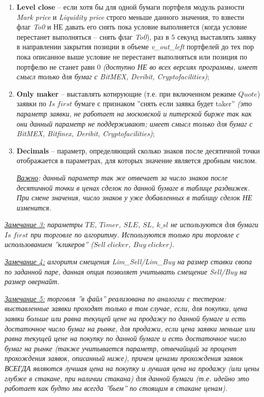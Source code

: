 \begin{enumerate}
	\item \textbf{Level close} -- если хотя бы для одной бумаги портфеля модуль разности \textit{Mark price} и \textit{Liquidity price} строго меньше данного
		значения, то взвести флаг \textit{To0} и НЕ давать его снять пока условие выполняется (когда условие перестанет выполняться -- снять флаг \textit{To0}), раз в $5$ секунд выставлять заявку в направлении закрытия позиции
		в объеме \textit{v\_out\_left} портфелей до тех пор пока описанное выше условие не перестанет выполняться или позиция по портфелю не станет равн $0$ \textit{(доступно НЕ во всех версиях программы, имеет смысл только для бумаг с BitMEX, Deribit, Cryptofacilities)};
	\item \textbf{Only maker} -- выставлять котирующие (т.е. при включенном режиме $Quote$) заявки по $Is \; first$ бумаге с признаком ''снять если заявка будет taker'' \textit{(это параметр заявки, не работает на московской и питерской бирже так как они данный параметр не поддерживают; имеет смысл только для бумаг с BitMEX, Bitfinex, Deribit, Cryptofacilities)};
	\item \textbf{Decimals} -- параметр, определяющий сколько знаков после десятичной точки отображается в параметрах, для которых значение является дробным числом.
		
	\textit{\underline{Важно}: данный параметр так же отвечает за число знаков после десятичной точки в ценах сделок по данной бумаге в таблице раздвижек. При смене значения, число знаков у уже добавленных в таблицу сделок НЕ изменится.}
\end{enumerate}

\noindent\label{comment3}\textit{\underline{Замечание 3:} параметры $TE$, $Timer$, $SLE$, $SL$, $k\_sl$ не используются для бумаги $Is \; first$ при торговле по алгоритму.
Используются только при торговле с использованием ''кликеров'' ($Sell \; clicker$, $Buy \; clicker$).\newline}

\noindent\label{comment4}\textit{\underline{Замечание 4:} алгоритм смещения Lim\_Sell/Lim\_Buy на размер ставки свопа по заданной паре, данная опция позволяет учитывать смещение Sell/Buy на размер овернайт.\newline}

\noindent\label{comment5}\textit{\underline{Замечание 5:} торговля ''в файл'' реализована по аналогии с тестером:
		выставленные заявки проходят только в том случае, если, для покупки, цена заявки больше или равна текущей цене на продажу по данной
		бумаге и есть достаточное число бумаг на рынке, для продажи, если цена заявки меньше или равна текущей цене на покупку по данной бумаге и есть достаточное число бумаг на рынке (также учитывается параметр, отвечайщий за процент
		прохождения заявок, описанный ниже), причем ценами прохождения заявок ВСЕГДА являются
		лучшая цена на покупку и лучшая цена на продажу (или цены глубже в стакане, при наличии стакана) для данной бумаги (т.е. идейно это работает как будто мы всегда ''бьем'' по стоящим в стакане ценам).\newline}

